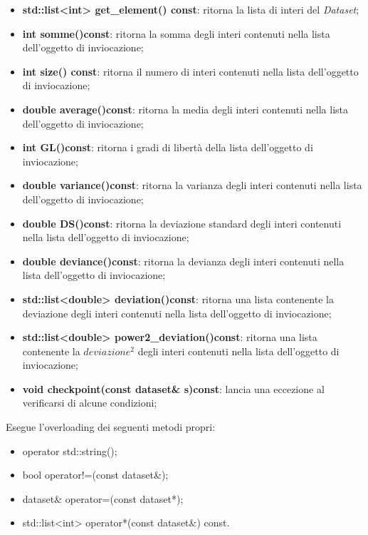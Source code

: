 \documentclass[a4paper,10pt]{article}
\begin{document}
    \begin{itemize}
        \item \textbf{std::list<int> get\_element() const}: ritorna la lista di interi del \textit{Dataset};
        \item \textbf{int somme()const}: ritorna la somma degli interi contenuti nella lista dell'oggetto di inviocazione;
        \item \textbf{int size() const}: ritorna il numero di interi contenuti nella lista dell'oggetto di inviocazione;
        \item \textbf{double average()const}: ritorna la media degli interi contenuti nella lista dell'oggetto di inviocazione;
        \item \textbf{int GL()const}: ritorna i gradi di libertà della lista dell'oggetto di inviocazione;
        \item \textbf{double variance()const}: ritorna la varianza degli interi contenuti nella lista dell'oggetto di inviocazione;
        \item \textbf{double DS()const}: ritorna la deviazione standard degli interi contenuti nella lista dell'oggetto di inviocazione;
        \item \textbf{double deviance()const}: ritorna la devianza degli interi contenuti nella lista dell'oggetto di inviocazione;
        \item \textbf{std::list<double> deviation()const}: ritorna una lista contenente la deviazione degli interi contenuti nella lista dell'oggetto di inviocazione;
        \item \textbf{std::list<double> power2\_deviation()const}: ritorna una lista contenente la $deviazione^{2}$ degli interi contenuti nella lista dell'oggetto di inviocazione;
        \item \textbf{void checkpoint(const dataset\& s)const}: lancia una eccezione al verificarsi di alcune condizioni;
    \end{itemize}
    Esegue l'overloading dei seguenti metodi propri:
    \begin{itemize}
        \item operator std::string();
        \item bool operator!=(const dataset\&);
        \item dataset\& operator=(const dataset*);
        \item std::list<int> operator*(const dataset\&) const.
    \end{itemize}
\end{document}
